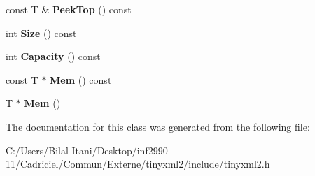 \begin{DoxyCompactItemize}
\item 
const T \& {\bfseries Peek\+Top} () const \hypertarget{classtinyxml2_1_1_dyn_array_a9c2282ea8901b5a92ccaac2e6166a788}{}\label{classtinyxml2_1_1_dyn_array_a9c2282ea8901b5a92ccaac2e6166a788}

\item 
int {\bfseries Size} () const \hypertarget{classtinyxml2_1_1_dyn_array_a1299b257b62ea6b4983c488867f219b0}{}\label{classtinyxml2_1_1_dyn_array_a1299b257b62ea6b4983c488867f219b0}

\item 
int {\bfseries Capacity} () const \hypertarget{classtinyxml2_1_1_dyn_array_a8edbe90ed53b2e46b1b5cf53b261e4e7}{}\label{classtinyxml2_1_1_dyn_array_a8edbe90ed53b2e46b1b5cf53b261e4e7}

\item 
const T $\ast$ {\bfseries Mem} () const \hypertarget{classtinyxml2_1_1_dyn_array_a1f39330daeb97d3d1dc3fc12dcf7ac67}{}\label{classtinyxml2_1_1_dyn_array_a1f39330daeb97d3d1dc3fc12dcf7ac67}

\item 
T $\ast$ {\bfseries Mem} ()\hypertarget{classtinyxml2_1_1_dyn_array_a0e0d60b399d54fad5b33d5008bc59c8e}{}\label{classtinyxml2_1_1_dyn_array_a0e0d60b399d54fad5b33d5008bc59c8e}

\end{DoxyCompactItemize}


The documentation for this class was generated from the following file\+:\begin{DoxyCompactItemize}
\item 
C\+:/\+Users/\+Bilal Itani/\+Desktop/inf2990-\/11/\+Cadriciel/\+Commun/\+Externe/tinyxml2/include/tinyxml2.\+h\end{DoxyCompactItemize}
